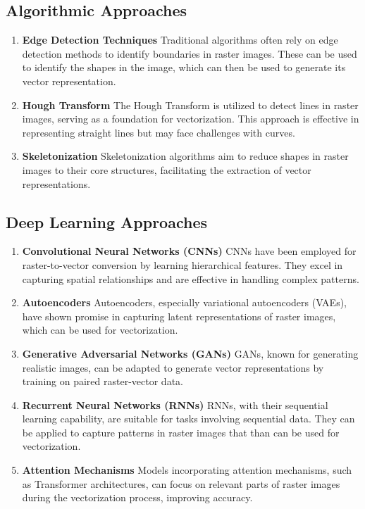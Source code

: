 \documentclass[12pt, a4paper, titlepage]{report}
\begin{document}
\subsection{Algorithmic Approaches}

\begin{enumerate}[label=\Roman*]
   \item \textbf{Edge Detection Techniques} Traditional algorithms often rely on edge detection methods to identify boundaries in raster images. These can be used to identify the shapes in the image, which can then be used to generate its vector representation.

   \item \textbf{Hough Transform} The Hough Transform is utilized to detect lines in raster images, serving as a foundation for vectorization. This approach is effective in representing straight lines but may face challenges with curves.

   \item \textbf{Skeletonization} Skeletonization algorithms aim to reduce shapes in raster images to their core structures, facilitating the extraction of vector representations.
\end{enumerate}

\subsection{Deep Learning Approaches}

\begin{enumerate}[label=\Roman*]
   \item \textbf{Convolutional Neural Networks (CNNs)} CNNs have been employed for raster-to-vector conversion by learning hierarchical features. They excel in capturing spatial relationships and are effective in handling complex patterns.

   \item \textbf{Autoencoders} Autoencoders, especially variational autoencoders (VAEs), have shown promise in capturing latent representations of raster images, which can be used for vectorization.

   \item \textbf{Generative Adversarial Networks (GANs)} GANs, known for generating realistic images, can be adapted to generate vector representations by training on paired raster-vector data.

   \item \textbf{Recurrent Neural Networks (RNNs)} RNNs, with their sequential learning capability, are suitable for tasks involving sequential data. They can be applied to capture patterns in raster images that than can be used for vectorization.

   \item \textbf{Attention Mechanisms} Models incorporating attention mechanisms, such as Transformer architectures, can focus on relevant parts of raster images during the vectorization process, improving accuracy.
\end{enumerate}
\end{document}
